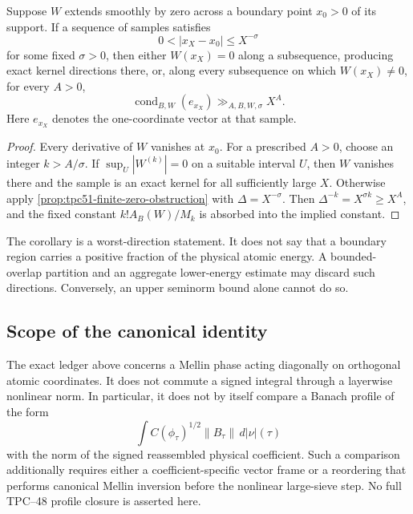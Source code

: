 \begin{corollary}
\label{cor:tpc51-flat-boundary-obstruction}
\label{cor:tpc51-boundary-zero}
Suppose \(W\) extends smoothly by zero across a boundary point \(x_0>0\)
of its support.  If a sequence of samples satisfies
\begin{equation}
 0<|x_X-x_0|\le X^{-\sigma}
 \label{eq:tpc51-flat-boundary-distance}
\end{equation}
for some fixed \(\sigma>0\), then either \(W(x_X)=0\) along a
subsequence, producing exact kernel directions there, or, along every
subsequence on which \(W(x_X)\ne0\), for every \(A>0\),
\begin{equation}
 \operatorname{cond}_{B,W}(e_{x_X})
 \gg_{A,B,W,\sigma}X^A.
 \label{eq:tpc51-flat-boundary-superpower}
\end{equation}
Here \(e_{x_X}\) denotes the one-coordinate vector at that sample.
\end{corollary}

\begin{proof}
Every derivative of \(W\) vanishes at \(x_0\).  For a prescribed
\(A>0\), choose an integer \(k>A/\sigma\).  If
\(\sup_U|W^{(k)}|=0\) on a suitable interval \(U\), then \(W\) vanishes
there and the sample is an exact kernel for all sufficiently large
\(X\).  Otherwise apply \cref{prop:tpc51-finite-zero-obstruction} with
\(\Delta=X^{-\sigma}\).  Then \(\Delta^{-k}=X^{\sigma k}\ge X^A\),
and the fixed constant \(k!A_B(W)/M_k\) is absorbed into the implied
constant.
\end{proof}

The corollary is a worst-direction statement.  It does not say that a
boundary region carries a positive fraction of the physical atomic
energy.  A bounded-overlap partition and an aggregate lower-energy
estimate may discard such directions.  Conversely, an upper seminorm
bound alone cannot do so.

\subsection{Scope of the canonical identity}

The exact ledger above concerns a Mellin phase acting diagonally on
orthogonal atomic coordinates.  It does not commute a signed integral
through a layerwise nonlinear norm.  In particular, it does not by
itself compare a Banach profile of the form
\[
 \int C(\phi_\tau)^{1/2}\|B_\tau\|\,d|\nu|(\tau)
\]
with the norm of the signed reassembled physical coefficient.  Such a
comparison additionally requires either a coefficient-specific vector
frame or a reordering that performs canonical Mellin inversion before
the nonlinear large-sieve step.  No full TPC--48 profile closure is
asserted here.
